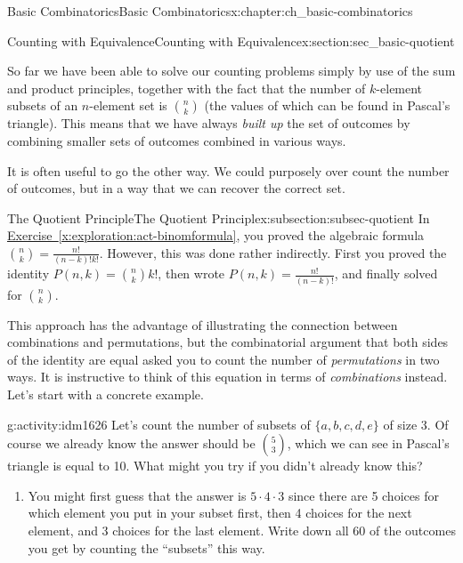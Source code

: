 \documentclass[oneside,10pt,]{book}
\numberwithin{equation}{chapter}
\begin{document}
\begin{chapterptx}{Basic Combinatorics}{}{Basic Combinatorics}{}{}{x:chapter:ch_basic-combinatorics}
%
\begin{sectionptx}{Counting with Equivalence}{}{Counting with Equivalence}{}{}{x:section:sec_basic-quotient}
\begin{introduction}{}%
So far we have been able to solve our counting problems simply by use of the sum and product principles, together with the fact that the number of \(k\)-element subsets of an \(n\)-element set is \(\binom{n}{k}\) (the values of which can be found in Pascal's triangle). This means that we have always \emph{built up} the set of outcomes by combining smaller sets of outcomes combined in various ways.%
\par
It is often useful to go the other way.  We could purposely over count the number of outcomes, but in a way that we can recover the correct set.%
\end{introduction}%
%
%
\typeout{************************************************}
\typeout{************************************************}
%
\begin{subsectionptx}{The Quotient Principle}{}{The Quotient Principle}{}{}{x:subsection:subsec-quotient}
In \hyperref[x:exploration:act-binomformula]{Exercise~\ref{x:exploration:act-binomformula}}, you proved the algebraic formula \(\binom{n}{k} = \frac{n!}{(n-k)!k!}\).  However, this was done rather indirectly.  First you proved the identity \(P(n,k) = \binom{n}{k}k!\), then wrote \(P(n,k) = \frac{n!}{(n-k)!}\), and finally solved for \(\binom{n}{k}\).%
\par
This approach has the advantage of illustrating the connection between combinations and permutations, but the combinatorial argument that both sides of the identity are equal asked you to count the number of \emph{permutations} in two ways.  It is instructive to think of this equation in terms of \emph{combinations} instead.  Let's start with a concrete example.%
\begin{activity}{}{g:activity:idm1626}%
Let's count the number of subsets of \(\{a,b,c,d,e\}\) of size 3.  Of course we already know the answer should be \(\binom{5}{3}\), which we can see in Pascal's triangle is equal to 10.  What might you try if you didn't already know this?%
\begin{enumerate}[font=\bfseries,label=(\alph*),ref=\alph*]
\item{}You might first guess that the answer is \(5\cdot 4 \cdot 3\) since there are 5 choices for which element you put in your subset first, then  4 choices for the next element, and 3 choices for the last element.  Write down all 60 of the outcomes you get by counting the ``subsets'' this way.\footnotemark{}%

\end{enumerate}
\end{activity}
\end{subsectionptx}
\end{sectionptx}
\end{chapterptx}
\end{document}
